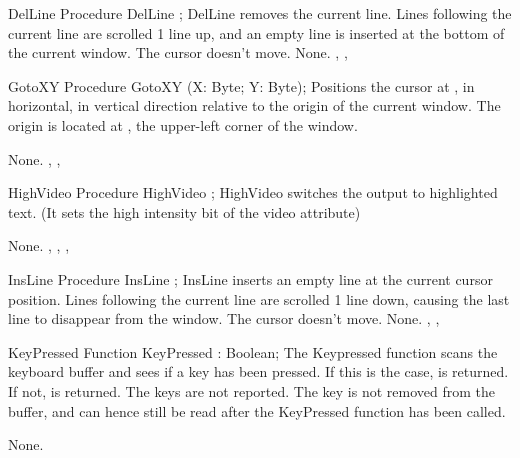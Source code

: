  
\begin{procedure}{DelLine}
\Declaration
Procedure DelLine ;
\Description
 DelLine removes the current line. Lines following the current line are 
scrolled 1 line up, and an empty line is inserted at the bottom of the
current window. The cursor doesn't move.
\Errors
None.
\SeeAlso
{}, , 
\end{procedure}

 
\begin{procedure}{GotoXY}
\Declaration
Procedure GotoXY (X: Byte; Y: Byte);
\Description
 Positions the cursor at ,  in horizontal,  in
vertical direction relative to the origin of the current window. The origin
is located at , the upper-left corner of the window.

\Errors
None.
\SeeAlso
 , ,  
\end{procedure}

 
\begin{procedure}{HighVideo}
\Declaration
Procedure HighVideo ;
\Description
 HighVideo switches the output to highlighted text. (It sets the high
intensity bit of the video attribute)

\Errors
None.
\SeeAlso
 , , ,
\end{procedure}

 
\begin{procedure}{InsLine}
\Declaration
Procedure InsLine ;
\Description
 InsLine inserts an empty line at the current cursor position. 
Lines following the current line are scrolled 1 line down, 
causing the last line to disappear from the window. 
The cursor doesn't move.
\Errors
None.
\SeeAlso
{}, , 
\end{procedure}

 
\begin{function}{KeyPressed}
\Declaration
Function KeyPressed  : Boolean;
\Description
 The Keypressed function scans the keyboard buffer and sees if a key has
been pressed. If this is the case,  is returned. If not,
 is returned. The  keys are not reported.
The key is not removed from the buffer, and can hence still be read after
the KeyPressed function has been called.

\Errors
None.
\SeeAlso
{}
\end{function}

